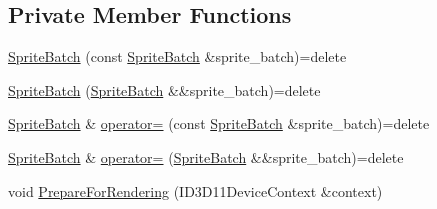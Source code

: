 \subsection*{Private Member Functions}
\begin{DoxyCompactItemize}
\item 
\hyperlink{classmage_1_1_sprite_batch_a10fe1d6cf1d2de9e087b370e7d696be8}{Sprite\+Batch} (const \hyperlink{classmage_1_1_sprite_batch}{Sprite\+Batch} \&sprite\+\_\+batch)=delete
\item 
\hyperlink{classmage_1_1_sprite_batch_a270604c9a535cc4fde6e5ff32b58618f}{Sprite\+Batch} (\hyperlink{classmage_1_1_sprite_batch}{Sprite\+Batch} \&\&sprite\+\_\+batch)=delete
\item 
\hyperlink{classmage_1_1_sprite_batch}{Sprite\+Batch} \& \hyperlink{classmage_1_1_sprite_batch_aa2a5df588d7589a36b38b35dc8a08a48}{operator=} (const \hyperlink{classmage_1_1_sprite_batch}{Sprite\+Batch} \&sprite\+\_\+batch)=delete
\item 
\hyperlink{classmage_1_1_sprite_batch}{Sprite\+Batch} \& \hyperlink{classmage_1_1_sprite_batch_ad46c172200bf47c10fa13fb3a70a4104}{operator=} (\hyperlink{classmage_1_1_sprite_batch}{Sprite\+Batch} \&\&sprite\+\_\+batch)=delete
\item 
void \hyperlink{classmage_1_1_sprite_batch_a6c065e5b9520dbc25354ed3a87525956}{Prepare\+For\+Rendering} (I\+D3\+D11\+Device\+Context \&context)
\end{DoxyCompactItemize}
